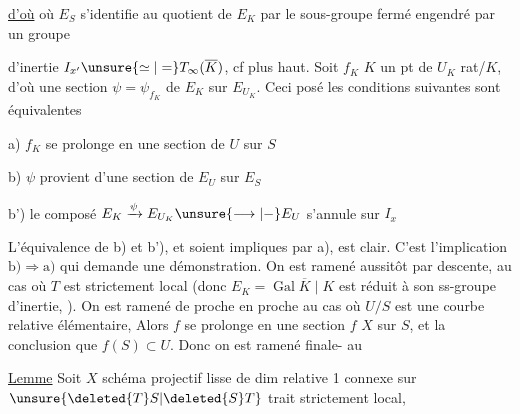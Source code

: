 \uline{d'où}
où $E_S$ s'identifie au quotient de $E_K$ par le sous-groupe  fermé engendré par un groupe

d'inertie $I_{x'}\unsure{\simeq|=}T_\infty(\overline K)$, cf plus haut. Soit $f_K$ $K$ un pt de $U_K$ rat/$K$, d'où une section $\psi=\psi_{f_K}$ de $E_K$ sur $E_{U_K}$. Ceci posé les conditions suivantes sont équivalentes

\noindent a) $f_K$ se prolonge en une section de $U$ sur $S$

\noindent b) $\psi$ provient d'une section de $E_U$ sur $E_S$

\noindent b') le composé $E_K\xrightarrow{\psi}E_{U_K}\unsure{\longrightarrow|-}E_U$ s'annule sur $I_x$


L'équivalence de b) et b'), et  soient impliques par a), est clair. C'est l'implication $\mathrm{b)}\Longrightarrow\mathrm{a)}$ qui demande une démonstration. On est ramené aussitôt\unsure{,} par descente, au cas  où $T$ est strictement local (donc $E_K=\operatorname{Gal}\overline K\mid K$ est réduit à son ss-groupe d'inertie, ). On est ramené de proche en proche au cas où $U/S$ est une courbe relative élémentaire,   \unsure{\deleted{,}|,}  Alors $f$ se prolonge en une section $f$   $X$ sur $S$, et la conclusion  que $f(S)\subset U$. Donc on est ramené finale-\newline {} au

\uline{Lemme} Soit $X$ schéma projectif lisse de dim relative 1 connexe sur $\unsure{\deleted{T}S|\deleted{S}T}$ trait strictement local,

